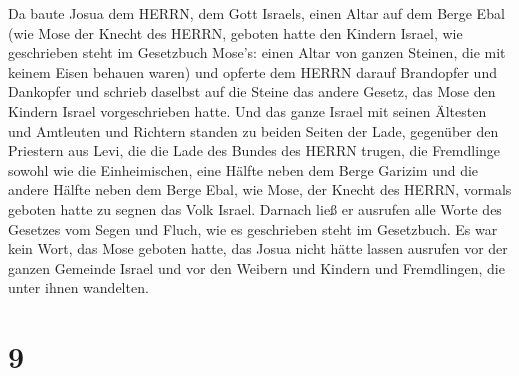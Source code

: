  Da baute Josua dem HERRN, dem Gott Israels, einen Altar
auf dem Berge Ebal  (wie Mose der Knecht des HERRN, geboten
hatte den Kindern Israel, wie geschrieben steht im Gesetzbuch Mose's:
einen Altar von ganzen Steinen, die mit keinem Eisen behauen waren) und
opferte dem HERRN darauf Brandopfer und Dankopfer  und
schrieb daselbst auf die Steine das andere Gesetz, das Mose den Kindern
Israel vorgeschrieben hatte.  Und das ganze Israel mit
seinen Ältesten und Amtleuten und Richtern standen zu beiden Seiten der
Lade, gegenüber den Priestern aus Levi, die die Lade des Bundes des
HERRN trugen, die Fremdlinge sowohl wie die Einheimischen, eine Hälfte
neben dem Berge Garizim und die andere Hälfte neben dem Berge Ebal, wie
Mose, der Knecht des HERRN, vormals geboten hatte zu segnen das Volk
Israel.  Darnach ließ er ausrufen alle Worte des Gesetzes
vom Segen und Fluch, wie es geschrieben steht im Gesetzbuch.
 Es war kein Wort, das Mose geboten hatte, das Josua nicht
hätte lassen ausrufen vor der ganzen Gemeinde Israel und vor den Weibern
und Kindern und Fremdlingen, die unter ihnen wandelten.

\hypertarget{section-8}{%
\section{9}\label{section-8}}

